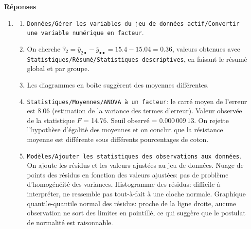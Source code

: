 \documentclass[12pt]{article}
\begin{document}
{\scriptsize
%
{\bf Réponses}
\begin{enumerate}
\item 
    \begin{enumerate}
    \item[(a)] {\tt Données/Gérer les variables du jeu de données actif/Convertir une variable numérique en facteur}.
    \item[(b)] On cherche     $\hat{\tau}_{2}=\overline{y}_{2\bullet}-\overline{y}_{\bullet\bullet}=15.4-15.04=0.36$, valeurs obtenues avec {\tt Statistiques/Résumé/Statistiques descriptives},  en faisant le résumé global et par groupe.
    \item[(c)] Les diagrammes en boîte suggèrent des moyennes différentes.
    \item[(d)] {\tt Statistiques/Moyennes/ANOVA à un facteur}: le carré moyen de l'erreur est 8.06 (estimation de la variance des termes d'erreur). Valeur observée de la statistique $F$ = 14.76. Seuil observé = $0.000\,009\,13$. On rejette l'hypothèse d'égalité des moyennes et on conclut que la résistance moyenne est différente sous différents pourcentages de coton.
    \item[(e)] {\tt Modèles/Ajouter les statistiques des observations aux données}. On ajoute les résidus et les valeurs ajustées au jeu de données. Nuage de points des résidus en fonction des valeurs ajustées: pas de problème d'homogénéité des variances. Histogramme des résidus: difficile à interpréter, ne ressemble pas tout-à-fait à une cloche normale. Graphique quantile-quantile normal des résidus: proche de la ligne droite, aucune observation ne sort des limites en pointillé, ce qui suggère que le postulat de normalité est raisonnable.
    \end{enumerate}


\end{enumerate}}
\end{document}
